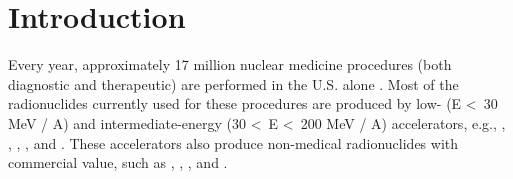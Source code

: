 
\section{Introduction} \label{sec:intro}

% 
% 
% 


Every year, approximately 17 million nuclear medicine procedures (both diagnostic and therapeutic) are performed in the U.S. alone 
\cite{Delbeke2011,NSACIsotopesSubcommittee2015}.
Most of the radionuclides currently used for these procedures are produced 
by low- (E \textless\ 30 MeV / A) and intermediate-energy (30 \textless\ E \textless\ 200 MeV / A) accelerators, 
e.g., , , , , and . 
These accelerators also produce 
non-medical radionuclides with commercial value, such as  , , , and   \cite{international2009iaea,schlyer2008cyclotron}. 
